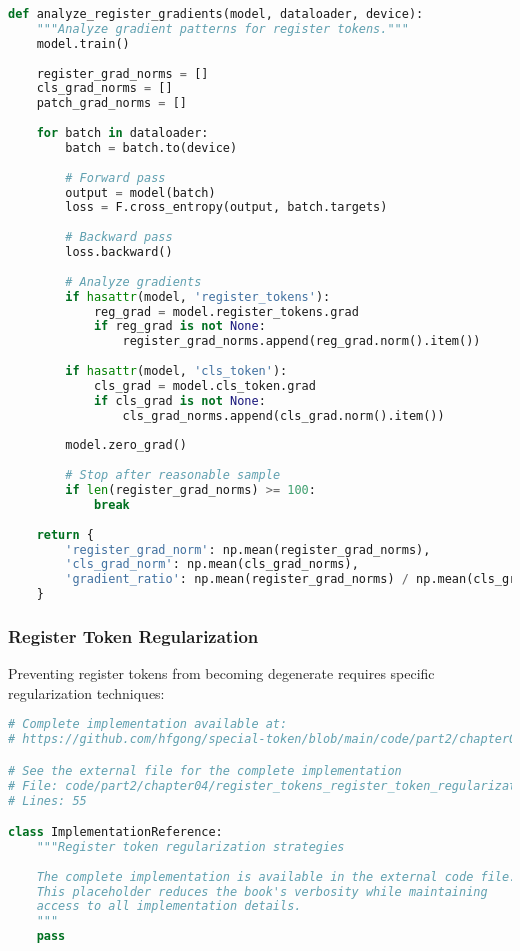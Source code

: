 \begin{lstlisting}[language=Python, caption=Register token gradient analysis during training]
def analyze_register_gradients(model, dataloader, device):
    """Analyze gradient patterns for register tokens."""
    model.train()
    
    register_grad_norms = []
    cls_grad_norms = []
    patch_grad_norms = []
    
    for batch in dataloader:
        batch = batch.to(device)
        
        # Forward pass
        output = model(batch)
        loss = F.cross_entropy(output, batch.targets)
        
        # Backward pass
        loss.backward()
        
        # Analyze gradients
        if hasattr(model, 'register_tokens'):
            reg_grad = model.register_tokens.grad
            if reg_grad is not None:
                register_grad_norms.append(reg_grad.norm().item())
        
        if hasattr(model, 'cls_token'):
            cls_grad = model.cls_token.grad
            if cls_grad is not None:
                cls_grad_norms.append(cls_grad.norm().item())
        
        model.zero_grad()
        
        # Stop after reasonable sample
        if len(register_grad_norms) >= 100:
            break
    
    return {
        'register_grad_norm': np.mean(register_grad_norms),
        'cls_grad_norm': np.mean(cls_grad_norms),
        'gradient_ratio': np.mean(register_grad_norms) / np.mean(cls_grad_norms)
    }
\end{lstlisting}

\subsubsection{Register Token Regularization}

Preventing register tokens from becoming degenerate requires specific regularization techniques:

\begin{lstlisting}[language=Python, caption={Register token regularization strategies}]
# Complete implementation available at:
# https://github.com/hfgong/special-token/blob/main/code/part2/chapter04/register_tokens_register_token_regularization_.py

# See the external file for the complete implementation
# File: code/part2/chapter04/register_tokens_register_token_regularization_.py
# Lines: 55

class ImplementationReference:
    """Register token regularization strategies
    
    The complete implementation is available in the external code file.
    This placeholder reduces the book's verbosity while maintaining
    access to all implementation details.
    """
    pass
\end{lstlisting}

